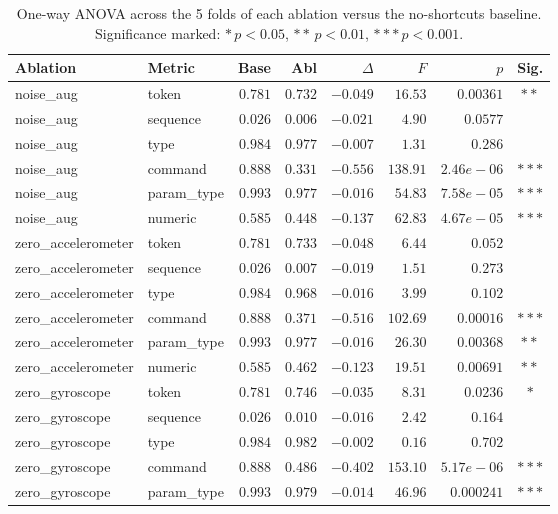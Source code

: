 \begin{table}[h]
\centering
\caption{One-way ANOVA across the 5 folds of each ablation versus the no-shortcuts baseline. Significance marked: $\ast\,p<0.05$, $\ast\ast\,p<0.01$, $\ast\ast\ast\,p<0.001$.}
\label{tab:anova}
\small
\begin{tabular}{l l r r r r r c}
\toprule
Ablation & Metric & Base & Abl & $\Delta$ & $F$ & $p$ & Sig. \\
\midrule
noise\_aug & token & $0.781$ & $0.732$ & $-0.049$ & $16.53$ & $0.00361$ & $\ast\ast$ \\
noise\_aug & sequence & $0.026$ & $0.006$ & $-0.021$ & $4.90$ & $0.0577$ &  \\
noise\_aug & type & $0.984$ & $0.977$ & $-0.007$ & $1.31$ & $0.286$ &  \\
noise\_aug & command & $0.888$ & $0.331$ & $-0.556$ & $138.91$ & $2.46e-06$ & $\ast\ast\ast$ \\
noise\_aug & param\_type & $0.993$ & $0.977$ & $-0.016$ & $54.83$ & $7.58e-05$ & $\ast\ast\ast$ \\
noise\_aug & numeric & $0.585$ & $0.448$ & $-0.137$ & $62.83$ & $4.67e-05$ & $\ast\ast\ast$ \\
zero\_accelerometer & token & $0.781$ & $0.733$ & $-0.048$ & $6.44$ & $0.052$ &  \\
zero\_accelerometer & sequence & $0.026$ & $0.007$ & $-0.019$ & $1.51$ & $0.273$ &  \\
zero\_accelerometer & type & $0.984$ & $0.968$ & $-0.016$ & $3.99$ & $0.102$ &  \\
zero\_accelerometer & command & $0.888$ & $0.371$ & $-0.516$ & $102.69$ & $0.00016$ & $\ast\ast\ast$ \\
zero\_accelerometer & param\_type & $0.993$ & $0.977$ & $-0.016$ & $26.30$ & $0.00368$ & $\ast\ast$ \\
zero\_accelerometer & numeric & $0.585$ & $0.462$ & $-0.123$ & $19.51$ & $0.00691$ & $\ast\ast$ \\
zero\_gyroscope & token & $0.781$ & $0.746$ & $-0.035$ & $8.31$ & $0.0236$ & $\ast$ \\
zero\_gyroscope & sequence & $0.026$ & $0.010$ & $-0.016$ & $2.42$ & $0.164$ &  \\
zero\_gyroscope & type & $0.984$ & $0.982$ & $-0.002$ & $0.16$ & $0.702$ &  \\
zero\_gyroscope & command & $0.888$ & $0.486$ & $-0.402$ & $153.10$ & $5.17e-06$ & $\ast\ast\ast$ \\
zero\_gyroscope & param\_type & $0.993$ & $0.979$ & $-0.014$ & $46.96$ & $0.000241$ & $\ast\ast\ast$ \\

\end{tabular}
\end{table}
